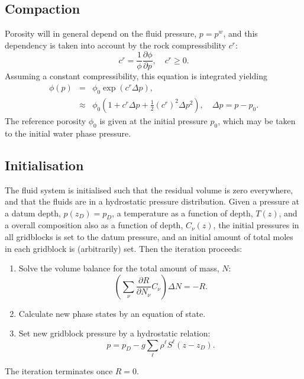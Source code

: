 
\subsection{Compaction}

Porosity will in general depend on the fluid pressure, $p=p^w$, and
this dependency is taken into account by the rock compressibility
$c^r$:
\begin{equation}
  c^r = \frac{1}{\phi} \frac{\partial\phi}{\partial p},
  \quad c^r\geq 0.
\end{equation}
Assuming a constant compressibility, this equation is integrated
yielding
\begin{eqnarray}
  \phi(p) & = & \phi_0 \exp\left( c^r \Delta p \right), \\
  & \approx & \phi_0 \left( 1 + c^r \Delta p +
    \frac{1}{2} \left(c^r\right)^2 \Delta p^2 \right),
  \quad \Delta p = p-p_0.
\end{eqnarray}
The reference porosity $\phi_0$ is given at the initial pressure
$p_0$, which may be taken to the initial water phase pressure.


\subsection{Initialisation}

The fluid system is initialised such that the residual volume is zero
everywhere, and that the fluids are in a hydrostatic pressure
distribution. Given a pressure at a datum depth, $p(z_D)=p_D$, a
temperature as a function of depth, $T(z)$, and a overall composition
also as a function of depth, $C_\nu(z)$, the initial pressures in all
gridblocks is set to the datum pressure, and an initial amount of
total moles in each gridblock is (arbitrarily) set. Then the iteration
proceeds:
\begin{enumerate}
\item Solve the volume balance for the total amount of mass, $N$:
  \[
  \left(\sum_\nu \frac{\partial R}{\partial N_\nu} C_\nu\right)
  \Delta N = -R.
  \]
\item Calculate new phase states by an equation of state.
\item Set new gridblock pressure by a hydrostatic relation:
  \[
  p = p_D - g \sum_\ell \rho^\ell S^\ell \left(
    z - z_D
  \right).
  \]
\end{enumerate}
The iteration terminates once $R=0$.

